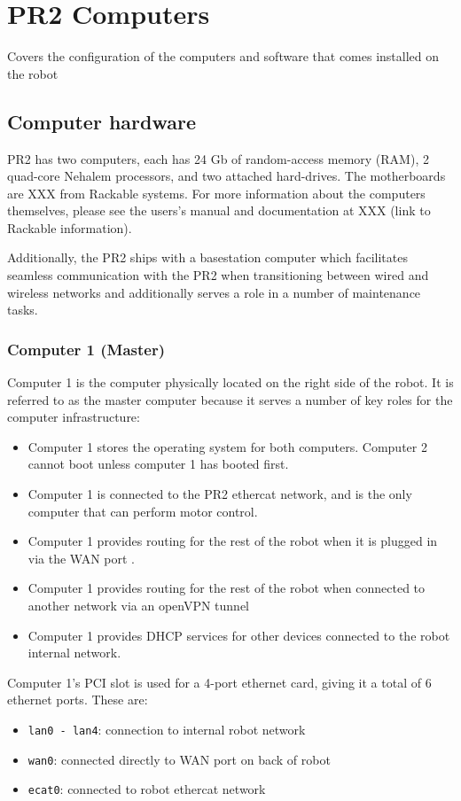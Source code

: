 \chapter{PR2 Computers}
Covers the configuration of the computers and software that comes installed on the robot
\section{Computer hardware}
PR2 has two computers, each has 24 Gb of random-access memory (RAM), 2
quad-core Nehalem processors, and two attached hard-drives.  The
motherboards are XXX from Rackable systems.  For more information
about the computers themselves, please see the users's manual and
documentation at XXX (link to Rackable information).

Additionally, the PR2 ships with a basestation computer which
facilitates seamless communication with the PR2 when transitioning
between wired and wireless networks and additionally serves a role in
a number of maintenance tasks.
\subsection{Computer 1 (Master)}
Computer 1 is the computer physically located on the right side of the
robot. It is referred to as the master computer because it serves a
number of key roles for the computer infrastructure:
\begin{itemize}
\item Computer 1 stores the operating system for both computers. 
  Computer 2 cannot boot unless computer 1 has booted first.
\item Computer 1 is connected to the PR2 ethercat network, and is the
  only computer that can perform motor control.
\item Computer 1 provides routing for the rest of the robot when it is plugged
  in via the WAN port .
\item Computer 1 provides routing for the rest of the robot when connected to
  another network via an openVPN tunnel
\item Computer 1 provides DHCP services for other devices connected to the
  robot internal network.
\end{itemize}

Computer 1's PCI slot is used for a 4-port ethernet card, giving it a
total of 6 ethernet ports. These are:
\begin{itemize}
\item \texttt{lan0 - lan4}: connection to internal robot network 
\item \texttt{wan0}: connected directly to WAN port on back of robot 
\item \texttt{ecat0}: connected to robot ethercat network 
\end{itemize}


